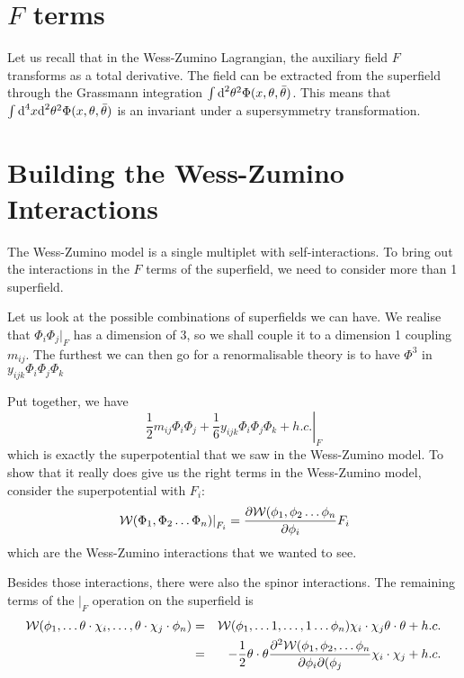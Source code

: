 \section{$F$ terms}
\label{ch:12:f terms}
Let us recall that in the Wess-Zumino Lagrangian, the auxiliary field $F$ transforms as a total derivative. The field can be extracted from the superfield through the Grassmann integration $\int \text{d}^2 \theta^2 \Phi(x, \theta, \Bar{\theta})$. This means that $\int \text{d}^4 x \text{d}^2 \theta^2 \Phi(x, \theta, \Bar{\theta})$ is an invariant under a supersymmetry transformation.

\section{Building the Wess-Zumino Interactions}
\label{ch:12:building the wess zumino interactions}
The Wess-Zumino model is a single multiplet with self-interactions. To bring out the interactions in the $F$ terms of the superfield, we need to consider more than 1 superfield.

Let us look at the possible combinations of superfields we can have. We realise that $\Phi_i \Phi_j \vert_F$ has a dimension of 3, so we shall couple it to a dimension 1 coupling $m_{ij}$. The furthest we can then go for a renormalisable theory is to have $\Phi^3$ in $y_{ijk} \Phi_i \Phi_j \Phi_k$

Put together, we have
\begin{equation}
    \left.\frac{1}{2} m_{ij} \Phi_i \Phi_j + \frac{1}{6} y_{ijk}\Phi_i\Phi_j\Phi_k + h.c. \right\vert_F
\end{equation}
which is exactly the superpotential that we saw in the Wess-Zumino model. To show that it really does give us the right terms in the Wess-Zumino model, consider the superpotential with $F_i$:
\begin{equation}
    \left.\mathcal{W} (\Phi_1, \Phi_2 \dots \Phi_n)\right\vert_{F_i} = \frac{\partial {\mathcal{W}(\phi_1, \phi_2 \dots \phi_n}}{\partial {\phi_i}} F_i
\end{equation}
which are the Wess-Zumino interactions that we wanted to see.

Besides those interactions, there were also the spinor interactions. The remaining terms of the $\big\vert_{F}$ operation on the superfield is
\begin{eqnarray}
    \mathcal{W}(\phi_1, \dots \theta \cdot \chi_i, \dots, \theta \cdot \chi_j \cdot \phi_n) &=& \mathcal{W}(\phi_1, \dots 1, \dots, 1 \dots \phi_n) \chi_i \cdot \chi_j \theta\cdot\theta + h.c. \nonumber \\
    &=& -\frac{1}{2} \theta \cdot \theta \frac{\partial {^2\mathcal{W}(\phi_1, \phi_2, \dots \phi_n}}{\partial {\phi_i \partial( \phi_j}} \chi_i \cdot \chi_j + h.c.
\end{eqnarray}

